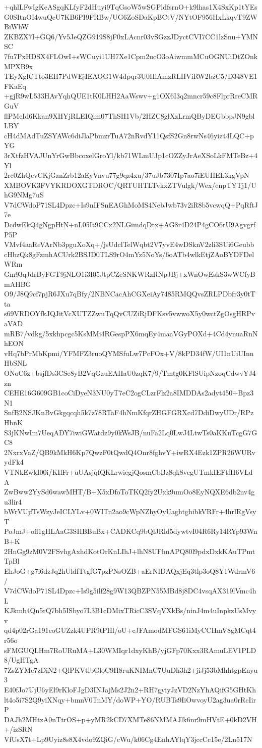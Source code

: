+qhlLFwIgKeASgqKLfyF2dHuyi9TqGsoW5wSGPldfsrnO+k9lhas1X4SxKp1tYEs
G0SItnOI4wuQcU7KB6PI9FRBw/UG6ZoSDaKpBCtV/NYtOF956HxLkqvT9ZWBiWhW
ZKBZX7I+GQ6/Yv5JeQZG919S8jF0xLAcnr03vSGzzJDyctCVI7CC1lzSnu+YMNSC
7fu7PxHDSX4FLOwI+sWCuyi1UH7Xe1Cpm2ucO3oAiwmmMCuOGNUiDtZOnkMPXB9x
TEyXglCTto3EH7PdWEjIEAOG1W4dpqr3U0HlAmzRLHViRW2bzC5/D348VE1FKaEq
+gjR9wL533HAvYqhQUE1tK0LHH2AaWswv+g1OX6I3q2mncr59c8FlprRreCMRGuV
flPMeId6Kkan9XHYjRLEIQlm07ThSH1Vb/2HZC8glXzLrmQByDEGbbpJN9gblLBY
cH4dMAdTuZSYAWc6diJlaPbmzrTuA72nRvdY11QsfS2Gn8rwNs46yiz44LQC+pYG
3rXtfzHVAJUnYrGwBbcoxelGroYl/kb71WLmUJp1cOZZyJrAeXSoLkFMTeBz+4Yl
2rc0ZhQcvCKjGznZrb12aEyVnvu77g9qz4xu/37uJb7307Ip7ao7iEUHEL3kgVpN
XMBOVK3FVYKRDOXGTDROC/QRTUHTLTvkxZTVulgk/Wex/enpTYTj1/UhG9NMg7uS
V7dCWdoP71SL4Dpzc+Is9nIFSnEAGhMoMS4NebJwb73v2iR8b5vcwqQ+PqRftJ7e
DcdwEkQ4gNgpHtN+nL05It9CCx2NLGimdqDtx+AG8r4D24P4gCO6rU9AgvgrfP5P
VMvf4aaReVArNb3pguXoXq+/jsUdclTelWqbt2V7yvE4wDSknV2zli3SUi6Geubb
cHbzQk8gFzmhACUrk2BSJD0TLS9rO4mYz5NoYs/6oATb4wlkEtjZAoBYDFDelWRm
Gm93qJdrByFGT9jNLO1i3I05JtpCZeSNKWRzRNpJBj+xWnOwEskS3wWCfyBmAHBG
O9/J8Q9cf7pjR6JXu7qBfy/2NBNCacAhCGXeiAy7485RMQQvsZRLPDbfr3y0tTta
s69VRDOYfkJQJitVcXUTZZwuTqQvCUZiRjDFKsv5vwwoX5y0wctZgOsgHRPvaVAD
mRB7/vdkg/5xkhpcgc5KsMMi4RGespPX6mqEy4maaVGyPOXd+4Cd4ynuaRnNhEON
vHq7bPrMbKpmi/YFMFZ3ruoQYMSfuLw7PcFOx+V/8kPD34fW/UI1nUiUInnHbSNL
ONoC6z+bsjfDs3CSe8yB2VqGzuEAHaU0zqK7/9/Tmtg0KFlSUipNzoqCdwvYJ4zn
CEHE16G609GB1coCiDyeN3NU0yT7eC2ogCLzrFlz2a8IMDDAs2adyt450+Bpz3N1
SnfB2NSJKnBvGkgqcqh5k7z78RTaF4hNmKfqrZHGFGRXcd7DdiDwyUDr/RPzHbnK
S3jKNwIm7UeqADY7iwiGWatdz9y0kWsJB/nuFa2Lq0LwJ4LtwTs0aKKuTcgG7GC8
2NxrxVaZ/QB9kMkH6Kp7QwzF0tQwdQ4Onr8fghvY+iwRX4Ezk1ZPR26WURvydFk4
VTNkEwkI00i/KIlFr+uUAsjqfQKLrwiegjQosmCbBz8qk8vegUTmkIEFtfH6VLdA
ZwBww2YySd6wawMHT/B+X5xDfoToTKQ2fy2Uxk9umOo8EyNQXE6db2nv4gu3lir4
bWrVUjfTsWzyJeICLYLv+0WITn2ao9cWpNZhyOyUaghtghibkVRFr+4hrlRgVsyT
PoJmJ+ofl1gHLAaG3SHBBuBx+CADKCq9bQlJRld5dywtvI04R6Ry14RYp93WnB+K
2HnGg9zM0V2FSvhgAxhdKotOrKnLIhJ+lhN8UFhnAPQ80l9pdxDxkKAuTPmtTpBl
EhJoG+g7i6dzJq2hUldfTtgfG7pzPNsOZB+aErNIDAQxjEq3tlp3oQ8Y1WdrmV6/
V7dCWdoP71SL4Dpzc+Is9g5ilf28g9W13QBZPN55MBd8j8DC4vsqAX319lVmc4hL
KJkmb4Qn5rQ7bh5ISbyo7L3B1cDMixTRicC3SVqVXkBs/ninJ4m4uInpkzUsMvyv
qd4p02rGa191coGUZzk4UPR9tPHl/oU+cJFAmodMFGS61iMyCCHmV8gMCqt4r56o
sFMGUQLHm7RoURuMA+L30WMIqr1dxyKhB/yjGFp70Kxx3RAmuLEV1PLD8/UgHTgA
7ZsZYMc7zDiN2+QlPKVtlbGloC9H8ruKNIMnC7UuDh3h2+jiJj53bMhhtgpEnyu3
E40fJo7UjU6yEl9rKloFJgD3INJajMs2J2n2+RH7gyiyJzVD2NzYhAQifG5GHtKh
lt4o5i7S2Q9yiXNqy+bmnV0TnMY/doWP+YO/RUBTs9IiOwvoyU2ag3ua0rRcIirP
DAJh2MHtzA0nTtrOS+p+yMR2kCD7XMTe86NMMAJlk6nr9mHVtE+0kD2VH+/izSRN
VfUsX7t+Lp9Uyiz8s8X4vdo9ZQiG/cWu/k06Cg4EnhAYlqY3jccCc15e/2Ln517N
